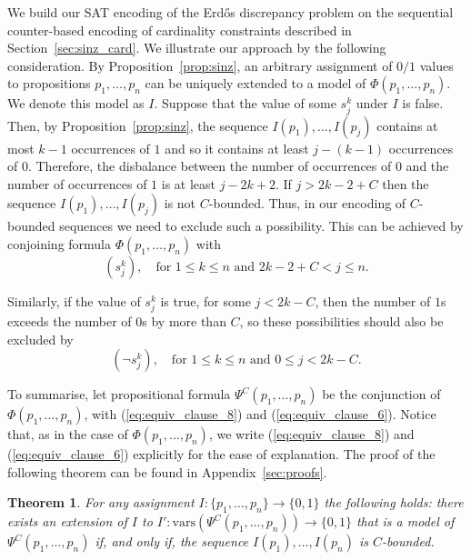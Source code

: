 \documentclass{article} \usepackage[utf8]{inputenc}
\newcommand*{\csf}{\ensuremath{{s}}}
\newcommand*{\Sinz}{\ensuremath{\Phi}}
\newcommand*{\Eq}{\ensuremath{\Psi}}
\newcommand*{\vars}{\ensuremath{\mathrm{vars}}}
\newtheorem{theorem}{Theorem}
\begin{document}
We build our SAT encoding of the Erd\H{o}s discrepancy problem on 
the sequential counter-based encoding of cardinality constraints described
in Section~\ref{sec:sinz_card}. We illustrate our approach by the following consideration.
By Proposition~\ref{prop:sinz}, an arbitrary 
assignment of $0/1$ values to propositions $p_1,\dots,p_n$ can be uniquely 
extended to a model of $\Sinz(p_1,\dots,p_n)$. We 
denote this model as $I$.
Suppose that the value of some $\csf^k_j$ under $I$ is false.
Then, by Proposition~\ref{prop:sinz}, the sequence $I(p_1),\dots,I(p_j)$ 
contains at most $k-1$ occurrences of $1$ and so it contains at least $j-(k-1)$
occurrences of $0$. Therefore, the disbalance between the number of occurrences
of $0$ and the number of occurrences of $1$ is at least $j-2k+2$.  If
$j>2k-2+C$ then the sequence $I(p_1),\dots,I(p_j)$ is not $C$-bounded. 
Thus, in our encoding of  $C$-bounded sequences we need to exclude such a possibility.
This can be achieved by conjoining formula $\Sinz(p_1,\dots,p_n)$  with
\begin{equation}
\label{eq:equiv_clause_8}(\csf^k_j), \quad \textrm{for $1\leq k \leq n$ and $2k-2+C < j \leq n$}.
\end{equation}

Similarly, if the value of $\csf^k_j$ is true, for some $j<2k-C$, then 
the number of $1$s exceeds the number of $0$s by more than $C$, so these
possibilities should also be excluded by
\begin{equation}
\label{eq:equiv_clause_6}(\lnot \csf^k_j),\quad  \textrm{for $1\leq k\leq n$ and  $0\leq j<2k-C $}.
\end{equation}

To summarise, let propositional formula $\Eq^{C}(p_1,\dots,p_n)$ be the conjunction of $\Sinz(p_1,\dots,p_n)$,
with (\ref{eq:equiv_clause_8}) and
(\ref{eq:equiv_clause_6}).
Notice that, as in the case of  $\Sinz(p_1,\dots,p_n)$, 
we write (\ref{eq:equiv_clause_8}) and (\ref{eq:equiv_clause_6}) explicitly
for the ease of explanation. The proof of the following theorem can 
be found in Appendix~\ref{sec:proofs}.
\begin{theorem}\label{th:cbounded}
For any assignment $I:\{p_1,\dots,p_n\}\to\{0,1\}$ the following holds: 
there exists an extension of $I$ to $I': \vars(\Eq^{C}(p_1,\dots,p_n))\to\{0,1\}$ that is 
a model of $\Eq^{C}(p_1,\dots,p_n)$ if, and only if, 
the sequence $I(p_1),\dots, I(p_n)$ is $C$-bounded.
\end{theorem}
\end{document}
